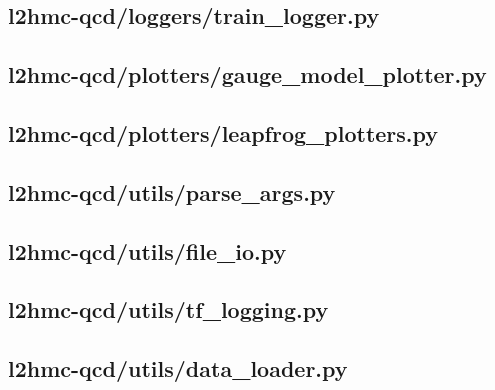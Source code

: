 \clearpage
\subsection{l2hmc-qcd/loggers/train\_logger.py}


\clearpage
\subsection{l2hmc-qcd/plotters/gauge\_model\_plotter.py}


\clearpage
\subsection{l2hmc-qcd/plotters/leapfrog\_plotters.py}


\clearpage
\subsection{l2hmc-qcd/utils/parse\_args.py}


\clearpage
\subsection{l2hmc-qcd/utils/file\_io.py}


\clearpage
\subsection{l2hmc-qcd/utils/tf\_logging.py}


\clearpage
\subsection{l2hmc-qcd/utils/data\_loader.py}




